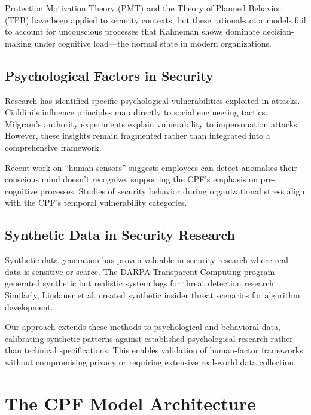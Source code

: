 \documentclass[10pt,twocolumn]{IEEEtran}
\begin{document}
Protection Motivation Theory (PMT) \cite{rogers1975} and the Theory of Planned Behavior (TPB) \cite{ajzen1991} have been applied to security contexts, but these rational-actor models fail to account for unconscious processes that Kahneman \cite{kahneman2011} shows dominate decision-making under cognitive load---the normal state in modern organizations.

\subsection{Psychological Factors in Security}

Research has identified specific psychological vulnerabilities exploited in attacks. Cialdini's influence principles \cite{cialdini2007} map directly to social engineering tactics. Milgram's authority experiments \cite{milgram1974} explain vulnerability to impersonation attacks. However, these insights remain fragmented rather than integrated into a comprehensive framework.

Recent work on ``human sensors'' \cite{oliveira2017} suggests employees can detect anomalies their conscious mind doesn't recognize, supporting the CPF's emphasis on pre-cognitive processes. Studies of security behavior during organizational stress \cite{cain2021} align with the CPF's temporal vulnerability categories.

\subsection{Synthetic Data in Security Research}

Synthetic data generation has proven valuable in security research where real data is sensitive or scarce. The DARPA Transparent Computing program \cite{darpa2023} generated synthetic but realistic system logs for threat detection research. Similarly, Lindauer et al. \cite{lindauer2017} created synthetic insider threat scenarios for algorithm development.

Our approach extends these methods to psychological and behavioral data, calibrating synthetic patterns against established psychological research rather than technical specifications. This enables validation of human-factor frameworks without compromising privacy or requiring extensive real-world data collection.

\section{The CPF Model Architecture}
\end{document}
